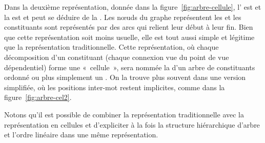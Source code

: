 {Dans la deuxième représentation, donnée dans la figure~\ref{fig:arbre-cellule},  l’ est  et la  est  et peut se déduire de la . Les nœuds du graphe représentent les  et les constituants sont représentés par des arcs qui relient leur début à leur fin.  Bien que cette représentation soit  moins usuelle, elle est tout aussi simple et légitime que la représentation traditionnelle.  Cette représentation, où chaque décomposition d'un constituant (chaque connexion vue du point de vue dépendentiel) forme une «~cellule~», sera nommée la  d'un arbre de constituants ordonné ou plus simplement un . On la trouve plus souvent dans une version simplifiée, où les positions inter-mot restent implicites, comme dans la figure~\ref{fig:arbre-cel2}.

Notons qu'il est possible de combiner la représentation traditionnelle avec la représentation en cellules et d'expliciter à la fois la structure hiérarchique d'arbre et l'ordre linéaire dans une même représentation. 
}
